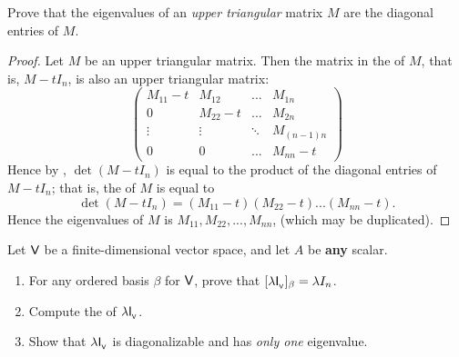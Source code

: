 \begin{exercise} \label{exercise 5.1.10}
Prove that the eigenvalues of an \emph{upper triangular} matrix \(M\) are the diagonal entries of \(M\).
\end{exercise}

\begin{proof}
Let \(M\) be an upper triangular matrix.
Then the matrix in the \CPOLY{} of \(M\), that is, \(M - tI_n\), is also an upper triangular matrix:
\[
    \begin{pmatrix}
        M_{11} - t & M_{12}     & ... & M_{1n} \\
        0          & M_{22} - t & ... & M_{2n} \\
        \vdots     & \vdots     & \ddots & M_{(n-1)n} \\
        0          & 0          & ... & M_{nn} - t
    \end{pmatrix}
\]
Hence by , \(\det(M - tI_n)\) is equal to the product of the diagonal entries of \(M - tI_n\);
that is, the \CPOLY{} of \(M\) is equal to
\[
    \det(M - tI_n) = (M_{11} - t)(M_{22} - t)...(M_{nn} - t).
\]
Hence the eigenvalues of \(M\) is \(M_{11}, M_{22}, ..., M_{nn}\), (which may be duplicated).
\end{proof}

\begin{exercise} \label{exercise 5.1.11}
Let \(\textsf{V}\) be a finite-dimensional vector space, and let \(A\) be \textbf{any} scalar.
\begin{enumerate}
\item For any ordered basis \(\beta\) for \(\textsf{V}\), prove that \([\lambda \textsf{I}_{_{\textsf{V}}}{}]_{\beta} = \lambda I_n\).
\item Compute the \CPOLY{} of \(\lambda \textsf{I}_{_{\textsf{V}}}{}\).
\item Show that \(\lambda \textsf{I}_{_{\textsf{V}}}{}\) is diagonalizable and has \emph{only one} eigenvalue.
\end{enumerate}
\end{exercise}

